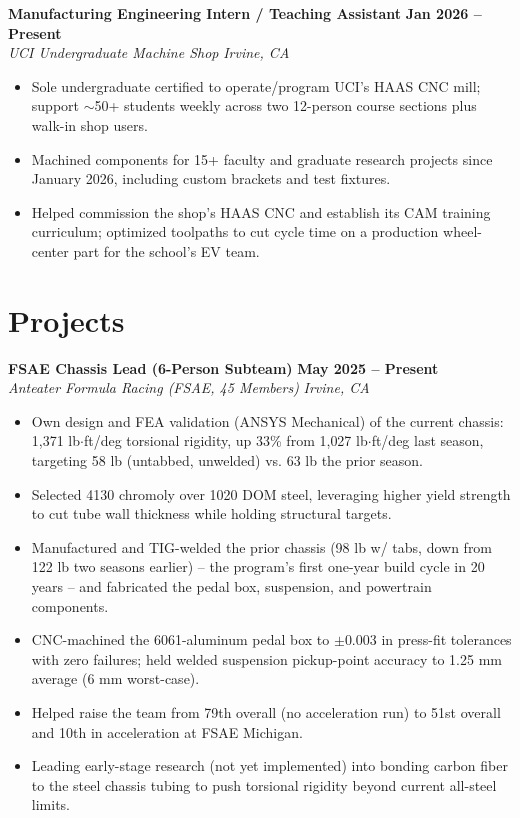\documentclass[10.5pt,letterpaper]{article}
\newenvironment{tightitemize}{%
  \begin{itemize}[leftmargin=13pt, itemsep=0pt, topsep=1pt, parsep=0pt, partopsep=0pt]
}{\end{itemize}}
\newcommand{\entry}[4]{%
  \textbf{#1} \hfill \textbf{#2}\\
  \textit{#3} \hfill \textit{#4}\\[-3pt]
}
\begin{document}
\entry{Manufacturing Engineering Intern / Teaching Assistant}{Jan 2026 -- Present}{UCI Undergraduate Machine Shop}{Irvine, CA}
\begin{tightitemize}
  \item Sole undergraduate certified to operate/program UCI's HAAS CNC mill; support $\sim$50+ students weekly across two 12-person course sections plus walk-in shop users.
  \item Machined components for 15+ faculty and graduate research projects since January 2026, including custom brackets and test fixtures.
  \item Helped commission the shop's HAAS CNC and establish its CAM training curriculum; optimized toolpaths to cut cycle time on a production wheel-center part for the school's EV team.
\end{tightitemize}

\section{Projects}

\entry{FSAE Chassis Lead (6-Person Subteam)}{May 2025 -- Present}{Anteater Formula Racing (FSAE, 45 Members)}{Irvine, CA}
\begin{tightitemize}
  \item Own design and FEA validation (ANSYS Mechanical) of the current chassis: 1{,}371 lb$\cdot$ft/deg torsional rigidity, up 33\% from 1{,}027 lb$\cdot$ft/deg last season, targeting 58 lb (untabbed, unwelded) vs. 63 lb the prior season.
  \item Selected 4130 chromoly over 1020 DOM steel, leveraging higher yield strength to cut tube wall thickness while holding structural targets.
  \item Manufactured and TIG-welded the prior chassis (98 lb w/ tabs, down from 122 lb two seasons earlier) -- the program's first one-year build cycle in 20 years -- and fabricated the pedal box, suspension, and powertrain components.
  \item CNC-machined the 6061-aluminum pedal box to $\pm$0.003 in press-fit tolerances with zero failures; held welded suspension pickup-point accuracy to 1.25 mm average (6 mm worst-case).
  \item Helped raise the team from 79th overall (no acceleration run) to 51st overall and 10th in acceleration at FSAE Michigan.
  \item Leading early-stage research (not yet implemented) into bonding carbon fiber to the steel chassis tubing to push torsional rigidity beyond current all-steel limits.
\end{tightitemize}
\end{document}
